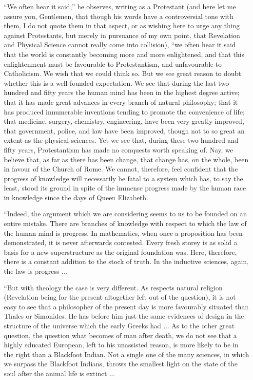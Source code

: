 ``We often hear it said,'' he observes, writing as a
Protestant (and here let me assure you, Gentlemen, that though his
words have a controversial tone with them, I do not quote them in that
aspect, or as wishing here to urge any thing against Protestants, but
merely in pursuance of my own point, that Revelation and Physical
Science cannot really come into collision), ``we often hear it
said that the world is constantly becoming more and more enlightened,
and that this enlightenment must be favourable to Protestantism, and
unfavourable to Catholicism. We wish that we could think so. But we
see great reason to doubt whether this is a well-founded expectation.
We see that during the last two hundred and fifty years the human mind
has been in the highest degree active; that it has made great advances
in every branch of natural philosophy; that it has produced
innumerable inventions tending to promote the convenience of
life; that medicine, surgery, chemistry, engineering, have been very
greatly improved, that government, police, and law have been improved,
though not to so great an extent as the physical sciences. Yet we see
that, during these two hundred and fifty years, Protestantism has made
no conquests worth speaking of. Nay, we believe that, as far as there
has been change, that change has, on the whole, been in favour of the
Church of Rome. We cannot, therefore, feel confident that the progress
of knowledge will necessarily be fatal to a system which has, to say
the least, stood its ground in spite of the immense progress made by
the human race in knowledge since the days of Queen Elizabeth.

``Indeed, the argument which we are considering seems to us to
be founded on an entire mistake. There are branches of knowledge with
respect to which the law of the human mind is progress. In
mathematics, when once a proposition has been demonstrated, it is
never afterwards contested. Every fresh storey is as solid a basis for
a new superstructure as the original foundation was. Here, therefore,
there is a constant addition to the stock of truth. In the inductive
sciences, again, the law is progress ...

``But with theology the case is very different. As respects
natural religion (Revelation being for the present altogether left out
of the question), it is not easy to see that a philosopher of the
present day is more favourably situated than Thales or Simonides. He
has before him just the same evidences of design in the structure of
the universe which the early Greeks had ... As to the other great
question, the question what becomes of man after death, we do not see
that a highly educated European, left to his unassisted reason, is
more likely to be in the right than a Blackfoot Indian. Not a
single one of the many sciences, in which we surpass the Blackfoot
Indians, throws the smallest light on the state of the soul after the
animal life is extinct ...


